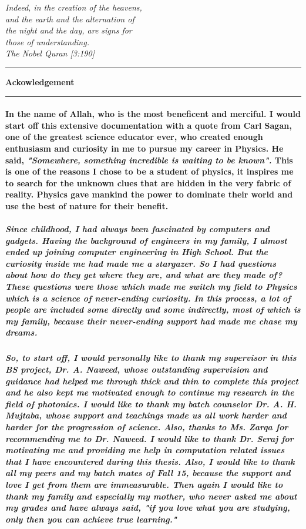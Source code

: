 \documentclass[12pt,twoside]{report}
\begin{document}
\newpage
\pagestyle{empty}
\begin{flushright}
\textit{\small{Indeed, in the creation of the heavens,\\ and the earth and the alternation of\\ the night and the day, are signs for\\ those of understanding.\\ The Nobel Quran [3:190]}}
\end{flushright}
\noindent\rule{15cm}{1pt}
\begin{flushleft}
\textbf{\Large{Ackowledgement}}
\end{flushleft}
\noindent\rule{15cm}{1pt} 
\paragraph{ \normalfont In the name of Allah, who is the most beneficent and merciful. I would start off this extensive documentation with a quote from Carl Sagan, one of the greatest science educator ever, who created enough enthusiasm and curiosity in me to pursue my career in Physics. He said, \textit{"Somewhere, something incredible is waiting to be known".} This is one of the reasons I chose to be a student of physics, it inspires me to search for the unknown clues that are hidden in the very fabric of reality. Physics gave mankind the power to dominate their world and use the best of nature for their benefit.}
\subparagraph{ \normalfont Since childhood, I had always been fascinated by computers and gadgets. Having the background of engineers in my family, I almost ended up joining computer engineering in High School. But the curiosity inside me had made me a stargazer. So I had questions about how do they get where they are, and what are they made of? These questions were those which made me switch my field to Physics which is a science of never-ending curiosity. In this process, a lot of people are included some directly and some indirectly, most of which is my family, because their never-ending support had made me chase my dreams.}
\subparagraph{ \normalfont So, to start off, I would personally like to thank my supervisor in this BS project, Dr. A. Naweed, whose outstanding supervision and guidance had helped me through thick and thin to complete this project and he also kept me motivated enough to continue my research in the field of photonics. I would like to thank my batch counselor Dr. A. H. Mujtaba, whose support and teachings made us all work harder and harder for the progression of science. Also, thanks to Ms. Zarqa for recommending me to Dr. Naweed. I would like to thank Dr. Seraj for motivating me and providing me help in computation related issues that I have encountered during this thesis. Also, I would like to thank all my peers and my batch mates of Fall 15, because the support and love I get from them are immeasurable. Then again I would like to thank my family and especially my mother, who never asked me about my grades and have always said, "if you love what you are studying, only then you can achieve true learning."}
\end{document}
